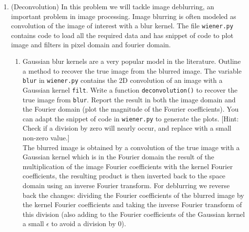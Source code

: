 \documentclass[12pt,twoside]{article}
\begin{document}
\begin{enumerate}
  \newpage
  \item (Deconvolution) In this problem we will tackle image deblurring, an important problem in image processing. Image blurring is often modeled as convolution of the image of interest with a blur kernel.  The file \texttt{wiener.py} contains code to load all the required data and has snippet of code to plot image and filters in pixel domain and fourier domain. 
  
 \begin{enumerate}
 \item Gaussian blur kernels are a very popular model in the literature.  Outline a method to recover the true image from the blurred image. The variable \texttt{blur} in \texttt{wiener.py} contains the 2D convolution of an image with a Gaussian kernel \texttt{filt}. Write a function \texttt{deconvolution()} to recover the true image from \texttt{blur}. Report the result in both the image domain and the Fourier domain (plot the magnitude of the Fourier coefficients). You can adapt the snippet of code in \texttt{wiener.py} to generate the plots. [Hint: Check if a division by zero will nearly occur, and replace with a small non-zero value.]\\
 
 The blurred image is obtained by a convolution of the true image with a Gaussian kernel which is in the Fourier domain the result of the multiplication of the image Fourier coefficients with the kernel Fourier coefficients, the resulting product is then inverted back to the space domain using an inverse Fourier transform. For deblurring we reverse back the changes: dividing the Fourier coefficients of the blurred image by the kernel Fourier coefficients and taking the inverse Fourier transform of this division
 (also adding to the Fourier coefficients of the Gaussian kernel a small $\epsilon$ to avoid a division by $0$).
 

\end{enumerate}
\end{enumerate}
\end{document}
